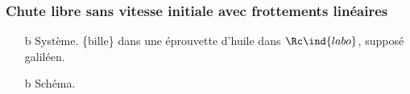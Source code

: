 \documentclass[../../main/main.tex]{subfiles}
\begin{document}
\subsubsection{Chute libre sans vitesse initiale avec frottements linéaires}
\hspace*{-0.75cm}
\begin{minipage}[t]{0.65\linewidth}
	\begin{enumerate}[label=\sqenumi]
		\item[b]{Système.} \{bille\} dans une
		      éprouvette d'huile dans $\Rc\ind{labo}$, supposé galiléen.
		\item[b]{Schéma.}
	\end{enumerate}
\end{minipage}
\hfill
\begin{minipage}[t]{0.30\linewidth}
	\begin{center}
		\vspace{-12pt}
	\end{center}
\end{minipage}
\vspace{-55pt}
\end{document}
